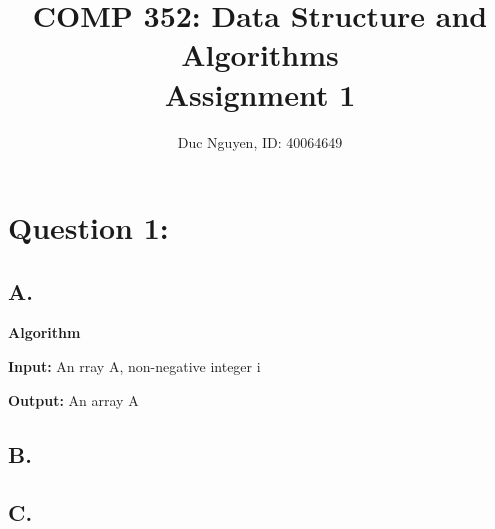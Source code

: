 \documentclass{article}
\title{COMP 352: Data Structure and Algorithms
	\\ Assignment 1}
\author{Duc Nguyen, ID: 40064649}
\date{}
\begin{document}
	\maketitle
	\section*{\textbf{Question 1:}}
		\subsection*{A.}
		\textbf{Algorithm }  

			\textbf{Input:} An rray A, non-negative integer i 

			\textbf{Output:} An array A

			 

		\subsection*{B.}
		\subsection*{C.}
\end{document}
